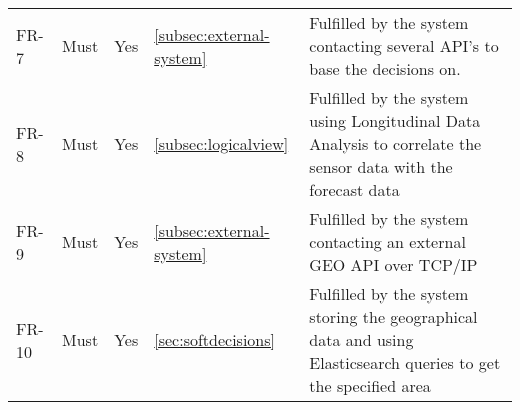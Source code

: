 \begin{table}[H]
\begin{tabular}{llllL{0.5\textwidth}}
		FR-7  & Must     & Yes        & \ref{subsec:external-system}         & Fulfilled by the system contacting several API's to base the decisions on. \\ 
		
		FR-8  & Must     & Yes        & \ref{subsec:logicalview}         & Fulfilled by the system using Longitudinal Data Analysis to correlate the sensor data with the forecast data \\ 
		
		FR-9  & Must     & Yes        & \ref{subsec:external-system} & Fulfilled by the system contacting an external GEO API over TCP/IP\\
		
		FR-10 & Must     & Yes        & \ref{sec:softdecisions}         & Fulfilled by the system storing the geographical data and using Elasticsearch queries to get the specified area \\ 
		

\end{tabular}
\end{table}
